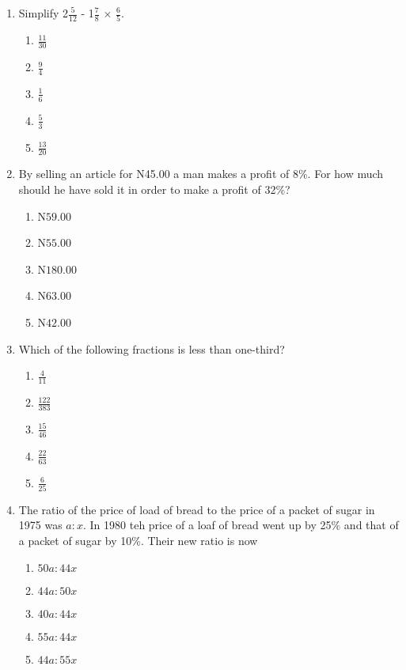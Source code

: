 \begin{multicols}{2}
\begin{enumerate}[label={\arabic*.}]
\begin{enumerate}[label={\Alph*.}]
    \end{enumerate}
\item Simplify 2\(\frac{5}{12}\) - 1\(\frac{7}{8}\) \(\times\) \(\frac{6}{5}\).
    \begin{enumerate}[label={\Alph*.}]
    \item \(\frac{11}{30}\)
    \item \(\frac{9}{4}\)
    \item \(\frac{1}{6}\)
    \item \(\frac{5}{3}\)
    \item \(\frac{13}{20}\)

    \end{enumerate}
\item By selling an article for N45.00 a man makes a profit of 8\%. For how much should he have sold it in order to make a profit of 32\%? 
    \begin{enumerate}[label={\Alph*.}]
    \item N\(59.00\)
    \item N\(55.00\)
    \item N\(180.00\)
    \item N\(63.00\)
    \item N\(42.00\)
    

    \end{enumerate}
\item Which of the following fractions is less than one-third?
    \begin{enumerate}[label={\Alph*.}]
    \item \(\frac{4}{11}\)
    \item \(\frac{122}{383}\)
    \item \(\frac{15}{46}\)
    \item \(\frac{22}{63}\)
    \item \(\frac{6}{25}\)

    \end{enumerate}
\item The ratio of the price of load of bread to the price of a packet of sugar in 1975 was \(a:x\). In 1980 teh price of a loaf of bread went up by 25\% and that of a packet of sugar by 10\%. Their new ratio is now
    \begin{enumerate}[label={\Alph*.}]
    \item \(50a:44x\)
    \item \(44a:50x\)
    \item \(40a:44x\)
    \item \(55a:44x\)
    \item \(44a:55x\)


\end{enumerate}
\end{enumerate}
\end{multicols}
